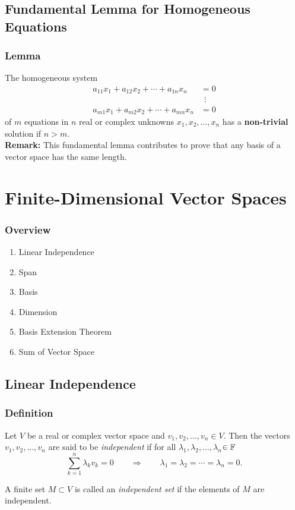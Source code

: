 \documentclass{beamer}
\renewcommand{\emph}[1]{{\color{Turquoise3}\textsl{#1}}}
\newcommand{\myseries}[2]{$#1_1,#1_2,\dots,#1_#2$}
\begin{document}
\subsection{Fundamental Lemma for Homogeneous Equations}
\begin{frame}
    \frametitle{Lemma}
    The homogeneous system
    \begin{align*}
        a_{11}x_1+a_{12}x_2+\cdots+a_{1n}x_n & =0       \\
                                             & ~~\vdots \\
        a_{m1}x_1+a_{m2}x_2+\cdots+a_{mn}x_n & =0
    \end{align*}
    of $m$ equations in $n$ real or complex unknowns \myseries{x}{n} has a \textbf{non-trivial} solution if $n>m$.\\[15pt]

    \textbf{Remark:} This fundamental lemma contributes to prove that any basis of a vector space has the same length.

\end{frame}

\section{Finite-Dimensional Vector Spaces}

\begin{frame}
    \frametitle{Overview}
    \begin{enumerate}
        \item Linear Independence
        \item Span
        \item Basis
        \item Dimension
        \item Basis Extension Theorem
        \item Sum of Vector Space
    \end{enumerate}
\end{frame}

\subsection{Linear Independence}
\begin{frame}
    \frametitle{Definition}
    Let $V$ be a real or complex vector space and \myseries{v}{n}$\in V$. Then the vectors \myseries{v}{n} are said to be \emph{independent} if for all \myseries{\lambda}{n}$\in\mathbb{F}$ \vspace*{-4mm}
    \[\sum_{k=1}^{n}\lambda_kv_k=0\qquad\Rightarrow\qquad\lambda_1=\lambda_2=\cdots=\lambda_n=0.\]

    A finite set $M\subset V$ is called an \emph{independent set} if the elements of $M$ are independent.
\end{frame}
\end{document}
